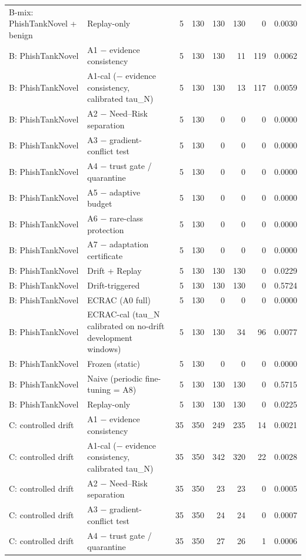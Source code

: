 \begin{table}[t]
\begin{tabular}{llrrrrrr}
B-mix: PhishTankNovel + benign & Replay-only & 5 & 130 & 130 & 130 & 0 & 0.0030 \\
B: PhishTankNovel & A1 − evidence consistency & 5 & 130 & 130 & 11 & 119 & 0.0062 \\
B: PhishTankNovel & A1-cal (− evidence consistency, calibrated tau\_N) & 5 & 130 & 130 & 13 & 117 & 0.0059 \\
B: PhishTankNovel & A2 − Need–Risk separation & 5 & 130 & 0 & 0 & 0 & 0.0000 \\
B: PhishTankNovel & A3 − gradient-conflict test & 5 & 130 & 0 & 0 & 0 & 0.0000 \\
B: PhishTankNovel & A4 − trust gate / quarantine & 5 & 130 & 0 & 0 & 0 & 0.0000 \\
B: PhishTankNovel & A5 − adaptive budget & 5 & 130 & 0 & 0 & 0 & 0.0000 \\
B: PhishTankNovel & A6 − rare-class protection & 5 & 130 & 0 & 0 & 0 & 0.0000 \\
B: PhishTankNovel & A7 − adaptation certificate & 5 & 130 & 0 & 0 & 0 & 0.0000 \\
B: PhishTankNovel & Drift + Replay & 5 & 130 & 130 & 130 & 0 & 0.0229 \\
B: PhishTankNovel & Drift-triggered & 5 & 130 & 130 & 130 & 0 & 0.5724 \\
B: PhishTankNovel & ECRAC (A0 full) & 5 & 130 & 0 & 0 & 0 & 0.0000 \\
B: PhishTankNovel & ECRAC-cal (tau\_N calibrated on no-drift development windows) & 5 & 130 & 130 & 34 & 96 & 0.0077 \\
B: PhishTankNovel & Frozen (static) & 5 & 130 & 0 & 0 & 0 & 0.0000 \\
B: PhishTankNovel & Naive (periodic fine-tuning = A8) & 5 & 130 & 130 & 130 & 0 & 0.5715 \\
B: PhishTankNovel & Replay-only & 5 & 130 & 130 & 130 & 0 & 0.0225 \\
C: controlled drift & A1 − evidence consistency & 35 & 350 & 249 & 235 & 14 & 0.0021 \\
C: controlled drift & A1-cal (− evidence consistency, calibrated tau\_N) & 35 & 350 & 342 & 320 & 22 & 0.0028 \\
C: controlled drift & A2 − Need–Risk separation & 35 & 350 & 23 & 23 & 0 & 0.0005 \\
C: controlled drift & A3 − gradient-conflict test & 35 & 350 & 24 & 24 & 0 & 0.0007 \\
C: controlled drift & A4 − trust gate / quarantine & 35 & 350 & 27 & 26 & 1 & 0.0006 \\

\end{tabular}
\end{table}
